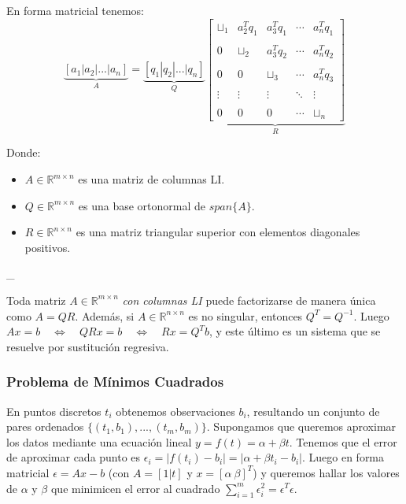 En forma matricial tenemos: \[
\underbrace{[a_1 | a_2 | ... | a_n]}_{A}
=
\underbrace{[q_1 | q_2 | ... | q_n]}_{Q}
\underbrace{
  \begin{bmatrix}
  \sqcup_1 & a_2^T q_1 & a_3^T q_1 & \cdots & a_n^T q_1 \\ \\
  0        & \sqcup_2  & a_3^T q_2 & \cdots & a_n^T q_2 \\ \\
  0        & 0         & \sqcup_3  & \cdots & a_n^T q_3 \\ \\
  \vdots   & \vdots    & \vdots    & \ddots & \vdots    \\ \\
  0        & 0         & 0         & \cdots & \sqcup_n  
  \end{bmatrix}}_{R}
\]

Donde:

\begin{itemize}
\tightlist
\item
  \(A \in \ensuremath{\mathbb{R}}^{m \times n}\) es una matriz de
  columnas LI.
\item
  \(Q \in \ensuremath{\mathbb{R}}^{m \times n}\) es una base ortonormal
  de \(span\{A\}\).
\item
  \(R \in \ensuremath{\mathbb{R}}^{n \times n}\) es una matriz
  triangular superior con elementos diagonales positivos.
\end{itemize}

\_

Toda matriz \(A \in \ensuremath{\mathbb{R}}^{m \times n}\) \emph{con
columnas LI} puede factorizarse de manera única como \(A = QR\). Además,
si \(A \in \ensuremath{\mathbb{R}}^{n \times n}\) es no singular,
entonces \(Q^T = Q^{-1}\). Luego
\(Ax = b \ensuremath{\quad\Longleftrightarrow\quad}QRx = b \ensuremath{\quad\Longleftrightarrow\quad}Rx = Q^T b\),
y este último es un sistema que se resuelve por sustitución regresiva.

\hypertarget{problema-de-muxednimos-cuadrados}{%
\subsubsection{Problema de Mínimos
Cuadrados}\label{problema-de-muxednimos-cuadrados}}

En puntos discretos \(t_i\) obtenemos observaciones \(b_i\), resultando
un conjunto de pares ordenados \(\{(t_1, b_1), ..., (t_m, b_m)\}\).
Supongamos que queremos aproximar los datos mediante una ecuación lineal
\(y = f(t) = \alpha + \beta t\). Tenemos que el error de aproximar cada
punto es \(\epsilon_i = |f(t_i) - b_i| = | \alpha + \beta t_i - b_i|\).
Luego en forma matricial \(\epsilon = Ax - b\) (con \(A = [1 | t]\) y
\(x = [\alpha\  \beta]^T\)) y queremos hallar los valores de \(\alpha\)
y \(\beta\) que minimicen el error al cuadrado
\(\sum_{i=1}^m \epsilon_i^2 = \epsilon^T \epsilon\).


